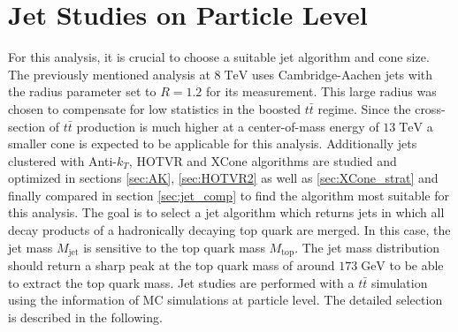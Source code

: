 \section{Jet Studies on Particle Level}
\label{sec:jet_studies}
	For this analysis, it is crucial to choose a suitable jet algorithm and cone size. The previously mentioned analysis at $8\;\text{TeV}$ \cite{torben_paper} uses Cambridge-Aachen jets with the radius parameter set to $R=1.2$ for its measurement. This large radius was chosen to compensate for low statistics in the boosted $t\bar{t}$ regime. Since the cross-section of $t\bar{t}$ production is much higher at a center-of-mass energy of $13\;\text{TeV}$ a smaller cone is expected to be applicable for this analysis. Additionally jets clustered with Anti-$k_T$, HOTVR and XCone algorithms are studied and optimized in sections \ref{sec:AK}, \ref{sec:HOTVR2} as well as \ref{sec:XCone_strat} and finally compared in section \ref{sec:jet_comp} to find the algorithm most suitable for this analysis. The goal is to select a jet algorithm which returns jets in which all decay products of a hadronically decaying top quark are merged. In this case, the jet mass $M_\text{jet}$ is sensitive to the top quark mass $M_\text{top}$. The jet mass distribution should return a sharp peak at the top quark mass of around $173\;\text{GeV}$ to be able to extract the top quark mass. Jet studies are performed with a $t\bar{t}$ simulation using the information of MC simulations at particle level. The detailed selection is described in the following.

